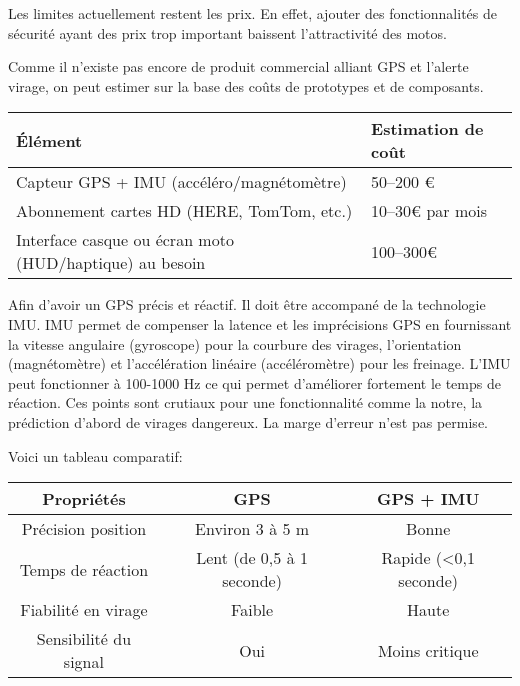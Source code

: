 
Les limites actuellement restent les prix. En effet, ajouter des fonctionnalités de sécurité ayant des prix trop important baissent l'attractivité des motos. 


Comme il n’existe pas encore de produit commercial alliant GPS et l'alerte virage, on peut estimer sur la base des coûts de prototypes et de composants.\\

\begin{tabular}{|l|l|}
\hline
\textbf{Élément} & \textbf{Estimation de coût} \\
\hline
Capteur GPS + IMU (accéléro/magnétomètre)  & 50–200 € \\
Abonnement cartes HD (HERE, TomTom, etc.) &    10–30€ par mois   \\
Interface casque ou écran moto (HUD/haptique) au besoin & 100–300€ \\
\hline
\end{tabular}

\vspace{0.5cm}
Afin d'avoir un GPS précis et réactif. Il doit être accompané de la technologie IMU. IMU permet de compenser la latence et les imprécisions GPS en fournissant la vitesse angulaire (gyroscope) pour la courbure des virages, l'orientation (magnétomètre) et l'accélération linéaire (accéléromètre) pour les freinage. L'IMU peut fonctionner à 100-1000 Hz ce qui permet d'améliorer fortement le temps de réaction. Ces points sont crutiaux pour une fonctionnalité comme la notre, la prédiction d'abord de virages dangereux. La marge d'erreur n'est pas permise.

Voici un tableau comparatif:\\
\begin{tabular}{|c|c|c|}
\hline
\textbf{Propriétés} & \textbf{GPS} & \textbf{GPS + IMU} \\
\hline
Précision position & Environ 3 à 5 m & Bonne \\
Temps de réaction & Lent (de 0,5 à 1 seconde) & Rapide (<0,1 seconde)\\
Fiabilité en virage & Faible & Haute \\
Sensibilité du signal & Oui & Moins critique \\
\hline
\end{tabular}

